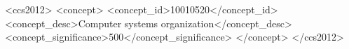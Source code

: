 \documentclass[sigconf]{acmart}
\begin{document}


\begin{CCSXML}
<ccs2012>
<concept>
<concept_id>10010520</concept_id>
<concept_desc>Computer systems organization</concept_desc>
<concept_significance>500</concept_significance>
</concept>
</ccs2012>
\end{CCSXML}




\end{document}
